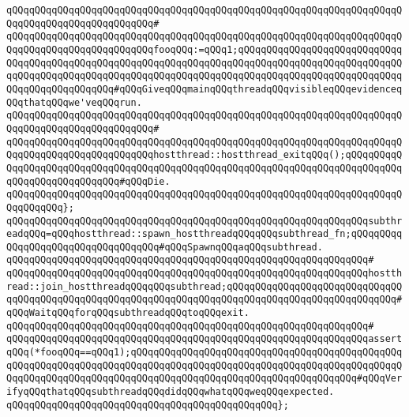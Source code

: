 \verb|qQQqqQQqqQQqqQQqqQQqqQQqqQQqqQQqqQQqqQQqqQQqqQQqqQQqqQQqqQQqqQQqqQQqqQQqqQQqqQQqqQQqqQQqqQQqqQQq#|\newline
\verb|qQQqqQQqqQQqqQQqqQQqqQQqqQQqqQQqqQQqqQQqqQQqqQQqqQQqqQQqqQQqqQQqqQQqqQQqqQQqqQQqqQQqqQQqqQQqqQQqfooqQQq:=qQQq1;qQQqqQQqqQQqqQQqqQQqqQQqqQQqqQQqqQQqqQQqqQQqqQQqqQQqqQQqqQQqqQQqqQQqqQQqqQQqqQQqqQQqqQQqqQQqqQQqqQQqqQQqqQQqqQQqqQQqqQQqqQQqqQQqqQQqqQQqqQQqqQQqqQQqqQQqqQQqqQQqqQQqqQQqqQQqqQQqqQQqqQQqqQQq#qQQqGiveqQQqmainqQQqthreadqQQqvisibleqQQqevidenceqQQqthatqQQqwe'veqQQqrun.|\newline
\verb|qQQqqQQqqQQqqQQqqQQqqQQqqQQqqQQqqQQqqQQqqQQqqQQqqQQqqQQqqQQqqQQqqQQqqQQqqQQqqQQqqQQqqQQqqQQqqQQq#|\newline
\verb|qQQqqQQqqQQqqQQqqQQqqQQqqQQqqQQqqQQqqQQqqQQqqQQqqQQqqQQqqQQqqQQqqQQqqQQqqQQqqQQqqQQqqQQqqQQqqQQqhostthread::hostthread_exitqQQq();qQQqqQQqqQQqqQQqqQQqqQQqqQQqqQQqqQQqqQQqqQQqqQQqqQQqqQQqqQQqqQQqqQQqqQQqqQQqqQQqqQQqqQQqqQQqqQQqqQQq#qQQqDie.|\newline
\verb|qQQqqQQqqQQqqQQqqQQqqQQqqQQqqQQqqQQqqQQqqQQqqQQqqQQqqQQqqQQqqQQqqQQqqQQqqQQqqQQq};|\newline
\newline
\verb|qQQqqQQqqQQqqQQqqQQqqQQqqQQqqQQqqQQqqQQqqQQqqQQqqQQqqQQqqQQqqQQqsubthreadqQQq=qQQqhostthread::spawn_hostthreadqQQqqQQqsubthread_fn;qQQqqQQqqQQqqQQqqQQqqQQqqQQqqQQqqQQq#qQQqSpawnqQQqaqQQqsubthread.|\newline
\verb|qQQqqQQqqQQqqQQqqQQqqQQqqQQqqQQqqQQqqQQqqQQqqQQqqQQqqQQqqQQqqQQq#|\newline
\verb|qQQqqQQqqQQqqQQqqQQqqQQqqQQqqQQqqQQqqQQqqQQqqQQqqQQqqQQqqQQqqQQqhostthread::join_hostthreadqQQqqQQqsubthread;qQQqqQQqqQQqqQQqqQQqqQQqqQQqqQQqqQQqqQQqqQQqqQQqqQQqqQQqqQQqqQQqqQQqqQQqqQQqqQQqqQQqqQQqqQQqqQQqqQQq#qQQqWaitqQQqforqQQqsubthreadqQQqtoqQQqexit.|\newline
\verb|qQQqqQQqqQQqqQQqqQQqqQQqqQQqqQQqqQQqqQQqqQQqqQQqqQQqqQQqqQQqqQQq#|\newline
\verb|qQQqqQQqqQQqqQQqqQQqqQQqqQQqqQQqqQQqqQQqqQQqqQQqqQQqqQQqqQQqqQQqassertqQQq(*fooqQQq==qQQq1);qQQqqQQqqQQqqQQqqQQqqQQqqQQqqQQqqQQqqQQqqQQqqQQqqQQqqQQqqQQqqQQqqQQqqQQqqQQqqQQqqQQqqQQqqQQqqQQqqQQqqQQqqQQqqQQqqQQqqQQqqQQqqQQqqQQqqQQqqQQqqQQqqQQqqQQqqQQqqQQqqQQqqQQqqQQqqQQqqQQq#qQQqVerifyqQQqthatqQQqsubthreadqQQqdidqQQqwhatqQQqweqQQqexpected.|\newline
\verb|qQQqqQQqqQQqqQQqqQQqqQQqqQQqqQQqqQQqqQQqqQQqqQQq};|\newline
\newline
\newline
